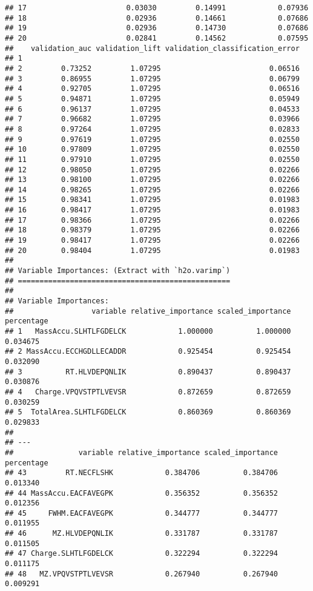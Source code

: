 \documentclass[]{article}
\begin{document}
\begin{verbatim}
## 17                       0.03030         0.14991            0.07936
## 18                       0.02936         0.14661            0.07686
## 19                       0.02936         0.14730            0.07686
## 20                       0.02841         0.14562            0.07595
##    validation_auc validation_lift validation_classification_error
## 1                                                                
## 2         0.73252         1.07295                         0.06516
## 3         0.86955         1.07295                         0.06799
## 4         0.92705         1.07295                         0.06516
## 5         0.94871         1.07295                         0.05949
## 6         0.96137         1.07295                         0.04533
## 7         0.96682         1.07295                         0.03966
## 8         0.97264         1.07295                         0.02833
## 9         0.97619         1.07295                         0.02550
## 10        0.97809         1.07295                         0.02550
## 11        0.97910         1.07295                         0.02550
## 12        0.98050         1.07295                         0.02266
## 13        0.98100         1.07295                         0.02266
## 14        0.98265         1.07295                         0.02266
## 15        0.98341         1.07295                         0.01983
## 16        0.98417         1.07295                         0.01983
## 17        0.98366         1.07295                         0.02266
## 18        0.98379         1.07295                         0.02266
## 19        0.98417         1.07295                         0.02266
## 20        0.98404         1.07295                         0.01983
## 
## Variable Importances: (Extract with `h2o.varimp`) 
## =================================================
## 
## Variable Importances: 
##                  variable relative_importance scaled_importance percentage
## 1   MassAccu.SLHTLFGDELCK            1.000000          1.000000   0.034675
## 2 MassAccu.ECCHGDLLECADDR            0.925454          0.925454   0.032090
## 3          RT.HLVDEPQNLIK            0.890437          0.890437   0.030876
## 4   Charge.VPQVSTPTLVEVSR            0.872659          0.872659   0.030259
## 5  TotalArea.SLHTLFGDELCK            0.860369          0.860369   0.029833
## 
## ---
##               variable relative_importance scaled_importance percentage
## 43         RT.NECFLSHK            0.384706          0.384706   0.013340
## 44 MassAccu.EACFAVEGPK            0.356352          0.356352   0.012356
## 45     FWHM.EACFAVEGPK            0.344777          0.344777   0.011955
## 46      MZ.HLVDEPQNLIK            0.331787          0.331787   0.011505
## 47 Charge.SLHTLFGDELCK            0.322294          0.322294   0.011175
## 48   MZ.VPQVSTPTLVEVSR            0.267940          0.267940   0.009291
\end{verbatim}
\end{document}
